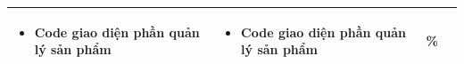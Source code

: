 \documentclass[a4paper,12pt]{report}
\begin{document}
\begin{center}
\begin{longtable}{|>{\centering\arraybackslash}p{3cm}|
        >{\centering\arraybackslash}p{5.5cm}|
        >{\centering\arraybackslash}p{5.5cm}|
        >{\centering\arraybackslash}p{1.5cm}|}
        \begin{itemize}
            \item Code giao diện phần quản lý sản phẩm
        \end{itemize}
                                                                                                                                      &
        \begin{itemize}
            \item Code giao diện phần quản lý sản phẩm
        \end{itemize}                                                                                    & 100\%                              \\
        \hline
    \end{longtable}
\end{center}

\vspace{1em}
\end{document}
